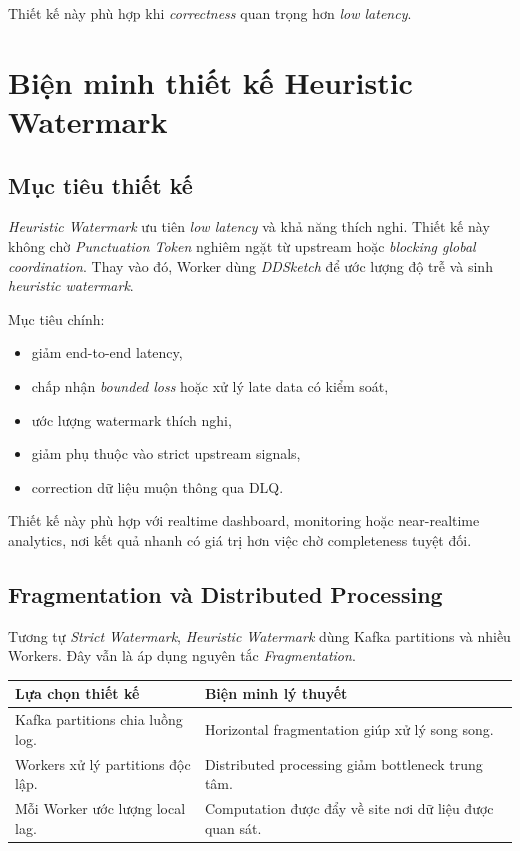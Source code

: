 \documentclass[12pt,a4paper]{article}
\begin{document}
Thiết kế này phù hợp khi \textit{correctness} quan trọng hơn \textit{low latency}.

\section{Biện minh thiết kế Heuristic Watermark}

\subsection{Mục tiêu thiết kế}

\textit{Heuristic Watermark} ưu tiên \textit{low latency} và khả năng thích nghi. Thiết kế này không chờ \textit{Punctuation Token} nghiêm ngặt từ upstream hoặc \textit{blocking global coordination}. Thay vào đó, Worker dùng \textit{DDSketch} để ước lượng độ trễ và sinh \textit{heuristic watermark}.

Mục tiêu chính:

\begin{itemize}
    \item giảm end-to-end latency,
    \item chấp nhận \textit{bounded loss} hoặc xử lý late data có kiểm soát,
    \item ước lượng watermark thích nghi,
    \item giảm phụ thuộc vào strict upstream signals,
    \item correction dữ liệu muộn thông qua DLQ.
\end{itemize}

Thiết kế này phù hợp với realtime dashboard, monitoring hoặc near-realtime analytics, nơi kết quả nhanh có giá trị hơn việc chờ completeness tuyệt đối.

\subsection{Fragmentation và Distributed Processing}

Tương tự \textit{Strict Watermark}, \textit{Heuristic Watermark} dùng Kafka partitions và nhiều Workers. Đây vẫn là áp dụng nguyên tắc \textit{Fragmentation}.

\begin{longtable}{p{} p{}}
\toprule
\textbf{Lựa chọn thiết kế} & \textbf{Biện minh lý thuyết} \\
\midrule
\endhead
Kafka partitions chia luồng log. & Horizontal fragmentation giúp xử lý song song. \\
Workers xử lý partitions độc lập. & Distributed processing giảm bottleneck trung tâm. \\
Mỗi Worker ước lượng local lag. & Computation được đẩy về site nơi dữ liệu được quan sát. \\
\bottomrule
\end{longtable}
\end{document}
